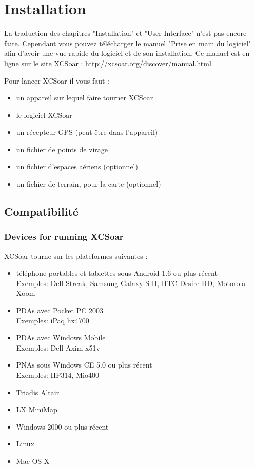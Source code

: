 \chapter{Installation}\label{cha:installation}

La traduction des chapitres "Installation" et "User Interface" n'est pas encore faite. Cependant vous pouvez télécharger le manuel "Prise en main du logiciel" afin d'avoir une vue rapide du logiciel et de son installation.
Ce manuel est en ligne sur le site XCSoar : {\href{http://xcsoar.org/discover/manual.html}{http://xcsoar.org/discover/manual.html}}


Pour lancer XCSoar il vous faut :

\begin{itemize}
\item un appareil sur lequel faire tourner XCSoar
\item le logiciel XCSoar
\item un récepteur GPS (peut être dans l'appareil)
\item un fichier de points de virage
\item un fichier d'espaces aériens (optionnel)
\item un fichier de terrain, pour la carte (optionnel)
\end{itemize}

\section{Compatibilité}

\subsection*{Devices for running XCSoar}

XCSoar tourne sur les plateformes suivantes :

\begin{itemize}
\item téléphone portables et tablettes sous Android 1.6 ou plus récent \\
  Exemples: Dell Streak, Samsung Galaxy S II, HTC Desire HD,
  Motorola Xoom
\item PDAs avec Pocket PC 2003 \\
  Exemples: iPaq hx4700
\item PDAs avec Windows Mobile \\
  Exemples: Dell Axim x51v
\item PNAs sous Windows CE 5.0 ou plus récent \\
  Exemples: HP314, Mio400
\item Triadis Altair
\item LX MiniMap
\item Windows 2000 ou plus récent
\item Linux
\item Mac OS X
\end{itemize}


